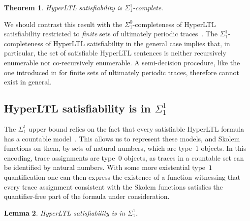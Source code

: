 \documentclass[dvipsnames,10pt,a4paper]{amsart}
\newtheorem{thm}{Theorem}[section]
\newtheorem{lem}[thm]{Lemma}
\theoremstyle{definition}
\theoremstyle{remark}
\newcommand{\hyltl}{{HyperLTL}\xspace}
\begin{document}
\begin{thm}\label{thm:hyltl-sat}
  \hyltl satisfiability is $\Sigma^1_1$-complete.
\end{thm}

We should contrast this result with the $\Sigma^0_1$-completeness of
\hyltl satisfiability restricted to
\emph{finite} sets of ultimately periodic traces~\cite[Theorem 1]{FHH18}. The $\Sigma^1_1$-completeness
of \hyltl satisfiability in the general case implies that, in particular, the set of
satisfiable \hyltl sentences is neither recursively enumerable nor co-recursively
enumerable. A semi-decision procedure, like the one introduced in \cite{FHH18}
for finite sets of ultimately periodic traces, therefore cannot exist in general.


\subsection{\texorpdfstring{\hyltl}{HyperLTL} satisfiability is in \texorpdfstring{$\Sigma_1^1$}{Sigma11}}
The $\Sigma^1_1$ upper bound relies on the fact that every satisfiable \hyltl
formula has a countable model~\cite{FZ17}. 
This allows us to represent these models, and Skolem functions on them, by sets of natural numbers, which are 
type~$1$ objects. In this encoding, trace assignments are type~$0$ objects, as traces in a countable set can be identified by natural numbers. With some more existential type~$1$ quantification one can then express the existence of a function witnessing that every trace assignment consistent with the Skolem functions satisfies the quantifier-free part of the formula under consideration. 

\begin{lem}
\label{lemma:hyltl_membership}
\hyltl satisfiability is in $\Sigma_1^1$.	
\end{lem}
\end{document}
